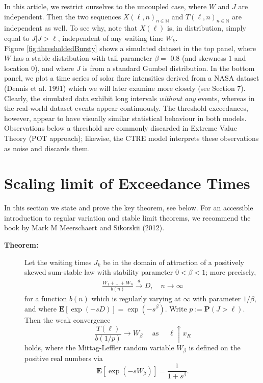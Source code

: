 \documentclass[]{elsarticle} %
\begin{document}
In this article, we restrict ourselves to the uncoupled case, where
\(W\) and \(J\) are independent. Then the two sequences
\(X(\ell, n)_{n \in \mathbb N}\) and \(T(\ell, n)_{n \in \mathbb N}\)
are independent as well. To see why, note that \(X(\ell)\) is, in
distribution, simply equal to \(J | J > \ell\), independent of any
waiting time \(W_k\).\\
Figure \ref{fig:thresholdedBursty} shows a simulated dataset in the top
panel, where \(W\) has a stable distribution with tail parameter
\(\beta =\) 0.8 (and skewness \(1\) and location \(0\)), and where \(J\)
is from a standard Gumbel distribution. In the bottom panel, we plot a
time series of solar flare intensities derived from a NASA dataset
(Dennis et al. 1991) which we will later examine more closely (see
Section 7). Clearly, the simulated data exhibit long intervals
\emph{without any} events, whereas in the real-world dataset events
appear continuously. The threshold exceedances, however, appear to have
visually similar statistical behaviour in both models. Observations
below a threshold are commonly discarded in Extreme Value Theory (POT
approach); likewise, the CTRE model interprets these observations as
noise and discards them.

\hypertarget{sec:scaling}{%
\section{Scaling limit of Exceedance Times}\label{sec:scaling}}

In this section we state and prove the key theorem, see below. For an
accessible introduction to regular variation and stable limit theorems,
we recommend the book by Mark M Meerschaert and Sikorskii (2012).

\begin{description}
\item[\textbf{Theorem:}]
Let the waiting times \(J_k\) be in the domain of attraction of a
positively skewed sum-stable law with stability parameter
\(0 < \beta < 1\); more precisely, \begin{align} \label{eq:stability}
\frac{W_1 + \ldots + W_n}{b(n)} \overset{d}{\longrightarrow} D, 
\quad n \to \infty
\end{align} for a function \(b(n)\) which is regularly varying at
\(\infty\) with parameter \(1/\beta\), and where
\(\mathbf E[\exp(-sD)] = \exp(-s^\beta)\). Write
\(p := \mathbf P(J > \ell)\). Then the weak convergence \[
\frac{T(\ell)} {b(1/p)} \to W_\beta \quad \text{ as } \quad \ell \uparrow x_R
\] holds, where the Mittag-Leffler random variable \(W_\beta\) is
defined on the positive real numbers via \[
\mathbf E[\exp(-sW_\beta)] = \frac{1}{1+s^\beta}.
\]
\end{description}
\end{document}
